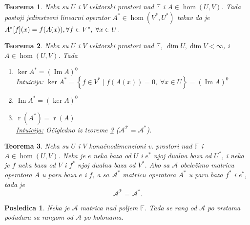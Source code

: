 \documentclass[a4paper,12pt,twoside]{report}
\newtheorem{theorem}{Teorema}[section]
\newtheorem{corollary}{Posledica}[theorem]
\numberwithin{algorithm}{section}
\begin{document}
\begin{theorem}
    Neka su $U$ i $V$ vektorski prostori nad $\mathbb{F}$ i $A \in \hom \left(U, V\right)$. Tada postoji jedinstveni linearni operator $A^* 
    \in \hom \left(V^*, U^*\right)$ takav da je $A^*[f](x) = f(A(x)), \linebreak \forall f \in V^*, \; \forall x \in U$.
\end{theorem}
\begin{theorem}
    Neka su $U$ i $V$ vektorski prostori nad $\mathbb{F}$, $\operatorname{dim} U, \operatorname{dim} V < \infty$, i \linebreak$A \in \hom \left(U, V\right)$. Tada
    \begin{enumerate}
        \item $\ker A^* = (\operatorname{Im} A)^0$ \\
        \underline{\textit{Intuicija:}} $\ker A^* = \left\{f \in V^* \; | \; f\left(A\left(x\right)\right) = 0, \; \forall x \in U\right\} = (\operatorname{Im} A )^0$
        \item $\operatorname{Im} A^* = (\ker A)^0$
        \item $\operatorname{r}(A^*) = \operatorname{r}(A)$\\
        \underline{\textit{Intuicija:}} Očigledno iz teoreme \ref{ATjednakoAzvezda} ($\mathcal{A^T} = \mathcal{A}^*$).
    \end{enumerate}
\end{theorem}
\begin{theorem}
    \label{ATjednakoAzvezda}
    Neka su $U$ i $V$ konačnodimenzioni v. prostori nad $\mathbb{F}$ i $A \in \hom \left(U, V\right)$. Neka je $e$ neka baza od $U$ i $e^*$ njoj dualna 
    baza od $U^*$, i neka je $f$ neka baza od $V$ i $f^*$ njoj dualna baza od $V^*$. Ako sa $\mathcal{A}$ obeležimo matricu operatora $A$ u paru baza $e$ i $f$, a sa
    $\mathcal{A}^*$ matricu operatora $A^*$ u paru baza $f^*$ i $e^*$, tada je \[\mathcal{A}^\mathcal{T} = \mathcal{A}^*.\]
\end{theorem}

\begin{corollary}
    Neka je $\mathcal{A}$ matrica nad poljem $\mathbb{F}$. Tada se rang od $\mathcal{A}$ po vrstama podudara sa rangom od $\mathcal{A}$ po kolonama.
\end{corollary} 
\newpage
\end{document}
